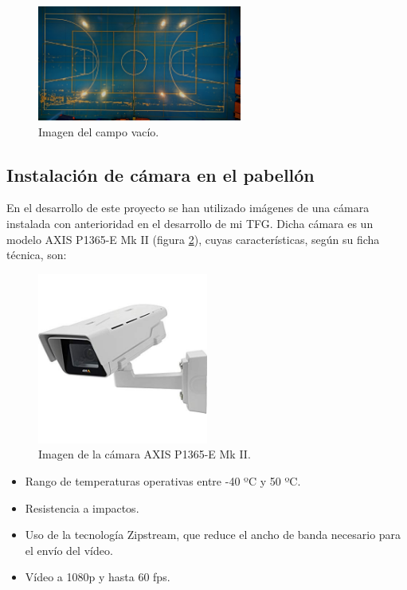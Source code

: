 \begin{figure}
    \centering
    \includegraphics[width=0.6\textwidth]{images/campo}
    \caption{Imagen del campo vacío.}
    \label{fig:campo}
\end{figure}

\subsection{Instalación de cámara en el pabellón}
En el desarrollo de este proyecto se han utilizado imágenes de una cámara instalada con anterioridad en el desarrollo de mi TFG. Dicha cámara es un modelo AXIS P1365-E Mk II (figura \ref{fig:camara}), cuyas características, según su ficha técnica, son:

\begin{figure}
    \centering
    \includegraphics[width=0.5\textwidth]{images/camara}
    \caption{Imagen de la cámara AXIS P1365-E Mk II.}
    \label{fig:camara}
\end{figure}

\begin{itemize}
    \item Rango de temperaturas operativas entre -40 ºC y 50 ºC.
    \item Resistencia a impactos.
    \item Uso de la tecnología Zipstream, que reduce el ancho de banda necesario para el envío del vídeo.
    \item Vídeo a 1080p y hasta 60 fps.
\end{itemize}

